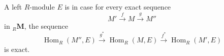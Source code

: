 A left $R$-module $E$ is  in case for every exact sequence
$$M' \xrightarrow{f} M \xrightarrow{g} M''$$
in ${}_R\mathbf{M}$, the sequence
$$\operatorname{Hom}_R(M'', E) \xrightarrow{g^*} \operatorname{Hom}_R(M, E) \xrightarrow{f^*} \operatorname{Hom}_R(M', E)$$
is exact.
